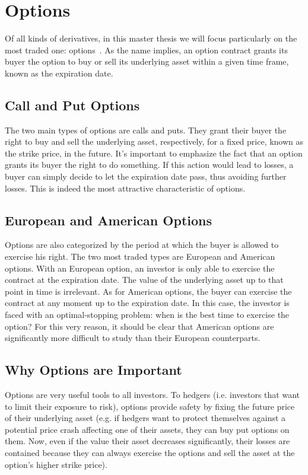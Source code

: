 \section{Options}
\label{section:options}
Of all kinds of derivatives, in this master thesis we will focus particularly on the most traded one: options~\cite{Hull}.
As the name implies, an option contract grants its buyer the option to buy or sell its underlying asset within a given time frame, known as the expiration date.

\subsection{Call and Put Options}
\label{subsection:calls and puts}
The two main types of options are calls and puts. They grant their buyer the right to buy and sell the underlying asset, respectively, for a fixed price, known as the strike price, in the future.
It's important to emphasize the fact that an option grants its buyer the right to do something. If this action would lead to losses, a buyer can simply decide to let the expiration date pass, thus avoiding further losses. This is indeed the most attractive characteristic of options.

\subsection{European and American Options}
\label{subsection:european and american options}
Options are also categorized by the period at which the buyer is allowed to exercise his right. The two most traded types are European and American options.
With an European option, an investor is only able to exercise the contract at the expiration date. The value of the underlying asset up to that point in time is irrelevant.
As for American options, the buyer can exercise the contract at any moment up to the expiration date.
In this case, the investor is faced with an optimal-stopping problem: when is the best time to exercise the option?
For this very reason, it should be clear that American options are significantly more difficult to study than their European counterparts.

\subsection{Why Options are Important}
\label{subsection:why options are important}
Options are very useful tools to all investors. 
To hedgers (i.e. investors that want to limit their exposure to risk), options provide safety by fixing the future price of their underlying asset (e.g. if hedgers want to protect themselves against a potential price crash affecting one of their assets, they can buy put options on them. Now, even if the value their asset decreases significantly, their losses are contained because they can always exercise the options and sell the asset at the option's higher strike price).

